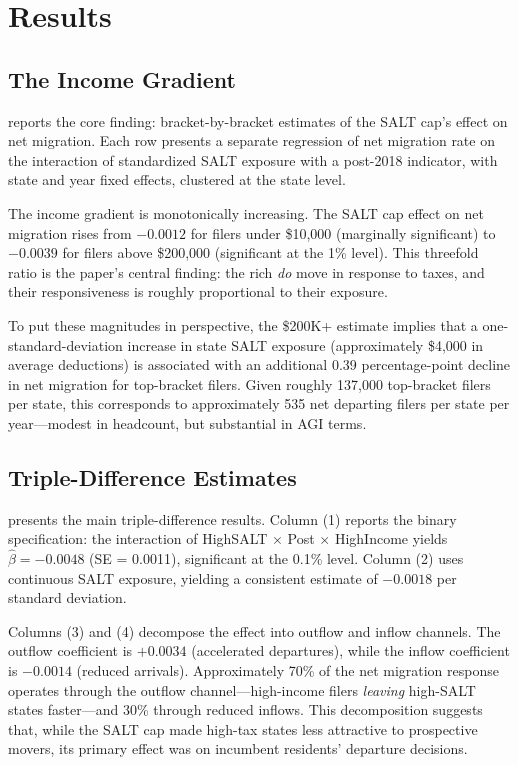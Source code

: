 \documentclass[12pt]{article}
\begin{document}
\section{Results}

\subsection{The Income Gradient}

 reports the core finding: bracket-by-bracket estimates of the SALT cap's effect on net migration. Each row presents a separate regression of net migration rate on the interaction of standardized SALT exposure with a post-2018 indicator, with state and year fixed effects, clustered at the state level.



The income gradient is monotonically increasing. The SALT cap effect on net migration rises from $-0.0012$ for filers under \$10,000 (marginally significant) to $-0.0039$ for filers above \$200,000 (significant at the 1\% level). This threefold ratio is the paper's central finding: the rich \textit{do} move in response to taxes, and their responsiveness is roughly proportional to their exposure.

To put these magnitudes in perspective, the \$200K+ estimate implies that a one-standard-deviation increase in state SALT exposure (approximately \$4,000 in average deductions) is associated with an additional 0.39 percentage-point decline in net migration for top-bracket filers. Given roughly 137,000 top-bracket filers per state, this corresponds to approximately 535 net departing filers per state per year---modest in headcount, but substantial in AGI terms.

\subsection{Triple-Difference Estimates}

 presents the main triple-difference results. Column (1) reports the binary specification: the interaction of HighSALT $\times$ Post $\times$ HighIncome yields $\hat{\beta} = -0.0048$ (SE = 0.0011), significant at the 0.1\% level. Column (2) uses continuous SALT exposure, yielding a consistent estimate of $-0.0018$ per standard deviation.



Columns (3) and (4) decompose the effect into outflow and inflow channels. The outflow coefficient is $+0.0034$ (accelerated departures), while the inflow coefficient is $-0.0014$ (reduced arrivals). Approximately 70\% of the net migration response operates through the outflow channel---high-income filers \textit{leaving} high-SALT states faster---and 30\% through reduced inflows. This decomposition suggests that, while the SALT cap made high-tax states less attractive to prospective movers, its primary effect was on incumbent residents' departure decisions.
\end{document}
